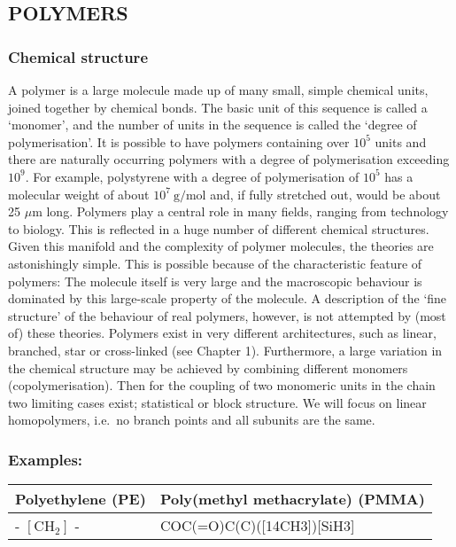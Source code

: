 \documentclass[
  letterpaper,
  DIV=11,
  numbers=noendperiod]{scrartcl}
\begin{document}
\subsection{POLYMERS}\label{polymers}

\subsubsection{Chemical structure}\label{chemical-structure}

A polymer is a large molecule made up of many small, simple chemical
units, joined together by chemical bonds. The basic unit of this
sequence is called a `monomer', and the number of units in the sequence
is called the `degree of polymerisation'. It is possible to have
polymers containing over \(10^{5}\) units and there are naturally
occurring polymers with a degree of polymerisation exceeding \(10^{9}\).
For example, polystyrene with a degree of polymerisation of \(10^{5}\)
has a molecular weight of about \(10^{7} \mathrm{~g} / \mathrm{mol}\)
and, if fully stretched out, would be about 25 \(\mu \mathrm{m}\) long.
Polymers play a central role in many fields, ranging from technology to
biology. This is reflected in a huge number of different chemical
structures. Given this manifold and the complexity of polymer molecules,
the theories are astonishingly simple. This is possible because of the
characteristic feature of polymers: The molecule itself is very large
and the macroscopic behaviour is dominated by this large-scale property
of the molecule. A description of the `fine structure' of the behaviour
of real polymers, however, is not attempted by (most of) these theories.
Polymers exist in very different architectures, such as linear,
branched, star or cross-linked (see Chapter 1). Furthermore, a large
variation in the chemical structure may be achieved by combining
different monomers (copolymerisation). Then for the coupling of two
monomeric units in the chain two limiting cases exist; statistical or
block structure. We will focus on linear homopolymers, i.e.~no branch
points and all subunits are the same.

\subsubsection{Examples:}\label{examples}

\begin{longtable}[]{@{}
  >{\centering\arraybackslash}p{}
  >{\centering\arraybackslash}p{}@{}}
\toprule\noalign{}
\begin{minipage}[b]{\linewidth}\centering
Polyethylene (PE)
\end{minipage} & \begin{minipage}[b]{\linewidth}\centering
Poly(methyl methacrylate) (PMMA)
\end{minipage} \\
\midrule\noalign{}
\endhead
\bottomrule\noalign{}
\endlastfoot
- \(\left[\mathrm{CH}_{2}\right]\) - &
COC(=O)C(C)({[}14CH3{]}){[}SiH3{]} \\
\end{longtable}
\end{document}
